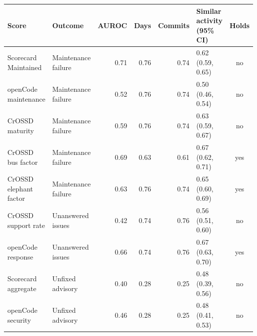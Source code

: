 \begin{tabular}{llrrrlc}
\toprule
Score & Outcome & AUROC & Days & Commits & Similar activity (95\% CI) & Holds \\
\midrule
Scorecard Maintained & Maintenance failure & 0.71 & 0.76 & 0.74 & 0.62 (0.59, 0.65) & no \\
openCode maintenance & Maintenance failure & 0.52 & 0.76 & 0.74 & 0.50 (0.46, 0.54) & no \\
CrOSSD maturity & Maintenance failure & 0.59 & 0.76 & 0.74 & 0.63 (0.59, 0.67) & no \\
CrOSSD bus factor & Maintenance failure & 0.69 & 0.63 & 0.61 & 0.67 (0.62, 0.71) & yes \\
CrOSSD elephant factor & Maintenance failure & 0.63 & 0.76 & 0.74 & 0.65 (0.60, 0.69) & yes \\
CrOSSD support rate & Unanswered issues & 0.42 & 0.74 & 0.76 & 0.56 (0.51, 0.60) & no \\
openCode response & Unanswered issues & 0.66 & 0.74 & 0.76 & 0.67 (0.63, 0.70) & yes \\
Scorecard aggregate & Unfixed advisory & 0.40 & 0.28 & 0.25 & 0.48 (0.39, 0.56) & no \\
openCode security & Unfixed advisory & 0.46 & 0.28 & 0.25 & 0.48 (0.41, 0.53) & no \\
\bottomrule
\end{tabular}

